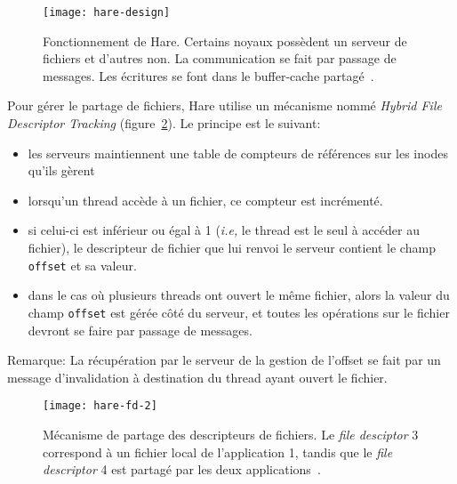       \begin{figure}[ht]
        \centering
        \texttt{[image: hare-design]}
        \caption{Fonctionnement de Hare. Certains noyaux possèdent un serveur de
          fichiers et d'autres non. La communication se fait par passage de
          messages. Les écritures se font dans le buffer-cache
          partagé~\citep{gruenwald2014providing}.}
        \label{fig:hare-design}
      \end{figure}

      Pour gérer le partage de fichiers, Hare utilise un mécanisme nommé
      \textit{Hybrid File Descriptor Tracking} (figure~\ref{fig:hare-fd}). Le
      principe est le suivant:
      \begin{itemize}
        \item les serveurs maintiennent une table de compteurs de références sur
          les inodes qu'ils gèrent
        \item lorsqu'un thread accède à un fichier, ce compteur est incrémenté.
        \item si celui-ci est inférieur ou égal à 1 (\textit{i.e,} le thread est
          le seul à accéder au fichier), le descripteur de fichier que lui
          renvoi le serveur contient le champ \texttt{offset} et sa valeur.
        \item dans le cas où plusieurs threads ont ouvert le même fichier, alors
          la valeur du champ \texttt{offset} est gérée côté du serveur, et
          toutes les opérations sur le fichier devront se faire par passage de
          messages.
      \end{itemize}

      \begin{paragraph}{Remarque:}
        La récupération par le serveur de la gestion de l'offset se fait par un
        message d'invalidation à destination du thread ayant ouvert le
        fichier.\\
      \end{paragraph}

      \begin{figure}[ht]
        \centering
        \texttt{[image: hare-fd-2]}
        \caption{Mécanisme de partage des descripteurs de fichiers. Le
          \textit{file desciptor} 3 correspond à un fichier local de
          l'application 1, tandis que le \textit{file descriptor} 4 est partagé
          par les deux applications~\citep{gruenwald2014providing}.}
        \label{fig:hare-fd}
      \end{figure}


